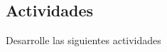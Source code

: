 \documentclass[letterpaper,11pt,twoside]{article}
\begin{document}
\subsection*{Actividades}
Desarrolle las siguientes actividades
\begin{enumerate}

\end{enumerate}
\end{document}

